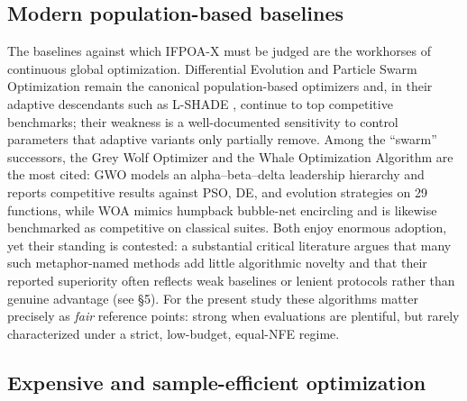 \documentclass[preprint,12pt]{elsarticle}
\begin{document}
\subsection{Modern population-based baselines}
\label{subsec2-3}

The baselines against which IFPOA-X must be judged are the workhorses of continuous global optimization. Differential Evolution \cite{storn1997differential} and Particle Swarm Optimization \cite{kennedy1995particle} remain the canonical population-based optimizers and, in their adaptive descendants such as L-SHADE \cite{tanabe2014improving}, continue to top competitive benchmarks; their weakness is a well-documented sensitivity to control parameters that adaptive variants only partially remove. Among the ``swarm'' successors, the Grey Wolf Optimizer and the Whale Optimization Algorithm are the most cited: GWO \cite{mirjalili2014grey} models an alpha--beta--delta leadership hierarchy and reports competitive results against PSO, DE, and evolution strategies on 29 functions, while WOA \cite{mirjalili2016whale} mimics humpback bubble-net encircling and is likewise benchmarked as competitive on classical suites. Both enjoy enormous adoption, yet their standing is contested: a substantial critical literature argues that many such metaphor-named methods add little algorithmic novelty and that their reported superiority often reflects weak baselines or lenient protocols rather than genuine advantage (see \S5). For the present study these algorithms matter precisely as \emph{fair} reference points: strong when evaluations are plentiful, but rarely characterized under a strict, low-budget, equal-NFE regime.

\subsection{Expensive and sample-efficient optimization}
\label{subsec2-4}
\end{document}
